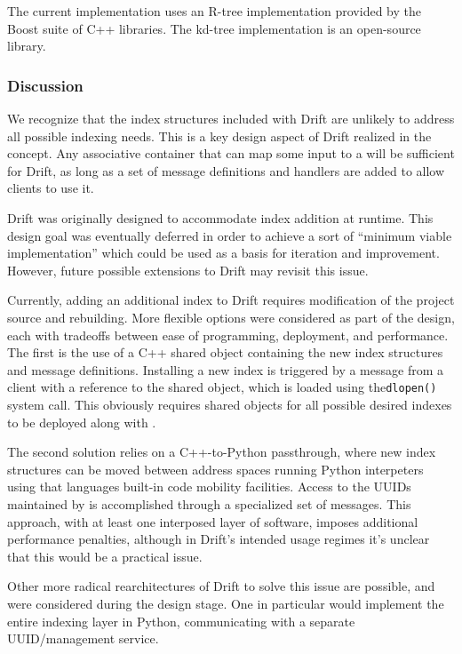 The current \driftd implementation uses an R-tree implementation provided by the Boost suite of C++
libraries\cite{boost_c_librar_spatial_index}.  The kd-tree implementation is an open-source library\cite{krafft}.


\subsubsection{Discussion}

We recognize that the index structures included with Drift are unlikely to address all possible indexing
needs.  This is a key design aspect of Drift realized in the \dpart concept.  Any associative container
that can map some input to a \dpart will be sufficient for Drift, as long as a set of message definitions
and handlers are added to allow \libdrift clients to use it.

Drift was originally designed to accommodate index addition at runtime.  This design goal was eventually
deferred in order to achieve a sort of ``minimum viable implementation'' which could be used as a basis
for iteration and improvement.  However, future possible extensions to Drift may revisit this issue.

Currently, adding an additional index to Drift requires modification of the project source and
rebuilding.  More flexible options were considered as part of the design, each with tradeoffs between
ease of programming, deployment, and performance.  The first is the use of a C++ shared object containing
the new index structures and message definitions.  Installing a new index is triggered by a message from
a client with a reference to the shared object, which is loaded using the\texttt{dlopen()} system call.
This obviously requires shared objects for all possible desired indexes to be deployed along with
\driftd.  

The second solution relies on a C++-to-Python passthrough, where new index structures can be moved
between address spaces running Python interpeters using that languages built-in code mobility
facilities.  Access to the \dpart UUIDs maintained by \libdrift is accomplished through a specialized set
of messages.  This approach, with at least one interposed layer of software, imposes additional
performance penalties, although in Drift's intended usage regimes it's unclear that this would be a
practical issue.

Other more radical rearchitectures of Drift to solve this issue are possible, and were considered during
the design stage.  One in particular would implement the entire indexing layer in Python, communicating
with a separate UUID/\dpart management service.  

